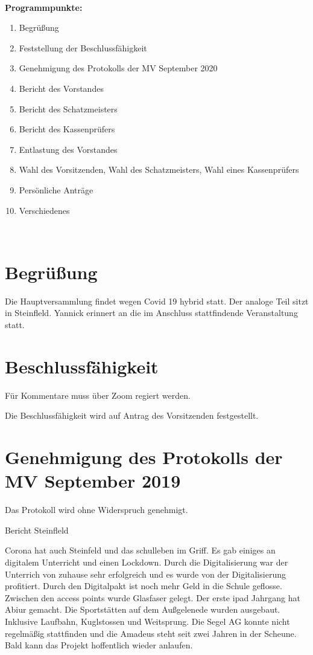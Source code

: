 \documentclass[a4paper, 11pt]{article}
\begin{document}
\makebox[\linewidth]{\rule{\linewidth}{0.4pt}}\\
\textbf{Programmpunkte:} 
\begin{enumerate}
\item Begrüßung
\item Feststellung der Beschlussfähigkeit
\item Genehmigung des Protokolls der MV September 2020
\item Bericht des Vorstandes
\item Bericht des Schatzmeisters
\item Bericht des Kassenprüfers
\item Entlastung des Vorstandes
\item Wahl des Vorsitzenden, Wahl des Schatzmeisters, Wahl eines Kassenprüfers
\item Persönliche Anträge
\item Verschiedenes
\end{enumerate}
\makebox[\linewidth]{\rule{\linewidth}{0.4pt}}\\

\newpage

\section*{Begrüßung}

Die Hauptversammlung findet wegen Covid 19 hybrid statt. Der analoge Teil sitzt in Steinfleld.
Yannick erinnert an die im Anschluss stattfindende Veranstaltung statt.

\section*{Beschlussfähigkeit}

Für Kommentare muss über Zoom regiert werden.

Die Beschlussfähigkeit wird auf Antrag des Vorsitzenden festgestellt.

\section*{Genehmigung des Protokolls der MV September 2019}

Das Protokoll wird ohne Widerspruch genehmigt.

Bericht Steinfleld

Corona hat auch Steinfeld und das schulleben im Griff.
Es gab einiges an digitalem Unterricht und einen Lockdown.
Durch die Digitalisierung war der Unterrich von zuhause sehr erfolgreich und es wurde von der Digitalisierung profitiert.
Durch den Digitalpakt ist noch mehr Geld in die Schule geflosse. Zwischen den access points wurde Glasfaser gelegt.
Der erste ipad Jahrgang hat Abiur gemacht.
Die Sportstätten auf dem Außgelenede wurden ausgebaut. Inklusive Laufbahn, Kuglstossen und Weitsprung.
Die Segel AG konnte nicht regelmäßig stattfinden und die Amadeus steht seit zwei Jahren in der Scheune.
Bald kann das Projekt hoffentlich wieder anlaufen.
\end{document}

